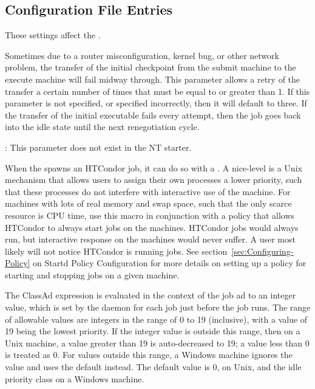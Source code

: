 \subsection{\label{sec:Starter-Config-File-Entries}
Configuration File Entries}

These settings affect the .
\begin{description}

\label{param:ExecTransferAttempts}
\item[\Macro{EXEC\_TRANSFER\_ATTEMPTS}]
  Sometimes due to a router misconfiguration, kernel bug, or other
  network problem, the transfer of the initial checkpoint from
  the submit machine to the execute machine will fail midway through.
  This parameter allows a retry of the transfer a certain number of times
  that must be equal to or greater than 1. If this parameter is not
  specified, or specified incorrectly, then it will default to three.
  If the transfer of the initial executable fails every attempt, then
  the job goes back into the idle state until the next renegotiation
  cycle.

  \Note: This parameter does not exist in the NT starter.

\label{param:JobReniceIncrement}
\item[\Macro{JOB\_RENICE\_INCREMENT}]
  When the  spawns an HTCondor job, it can do so with a
  .
  A nice-level is a
  Unix mechanism that allows users to assign their own processes a lower 
  priority, such that these processes do not interfere with interactive
  use of the machine.
  For machines with lots
  of real memory and swap space, such that the only scarce resource is CPU time,
  use this macro in conjunction with a policy that
  allows HTCondor to always start jobs on the machines. 
  HTCondor jobs would always run,
  but interactive response on the machines would never suffer.
  A user most likely will not notice HTCondor is
  running jobs.  See section~\ref{sec:Configuring-Policy} on
  Startd Policy Configuration for more details on setting up a
  policy for starting and stopping jobs on a given machine.

  The ClassAd expression is evaluated in the context of the job ad
  to an integer value, which is
  set by the  daemon for each job just before the
  job runs.
  The range of allowable values are integers in the range of 0 to 19
  (inclusive),
  with a value of 19 being the lowest priority.  
  If the integer value is outside this range,
  then on a Unix machine, a value greater than 19 is auto-decreased to 19;
  a value less than 0 is treated as 0.
  For values outside this range, a Windows machine ignores the value
  and uses the default instead.
  The default value is 0, on Unix, and the idle priority class on
  a Windows machine.


\end{description}
